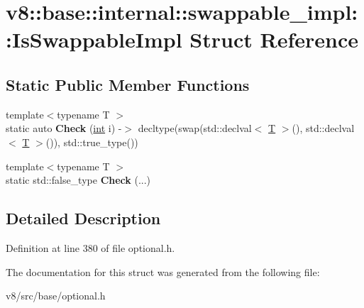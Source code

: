 \hypertarget{structv8_1_1base_1_1internal_1_1swappable__impl_1_1IsSwappableImpl}{}\section{v8\+:\+:base\+:\+:internal\+:\+:swappable\+\_\+impl\+:\+:Is\+Swappable\+Impl Struct Reference}
\label{structv8_1_1base_1_1internal_1_1swappable__impl_1_1IsSwappableImpl}
\subsection*{Static Public Member Functions}
\begin{DoxyCompactItemize}
\item 
\mbox{\label{structv8_1_1base_1_1internal_1_1swappable__impl_1_1IsSwappableImpl_ade0dc9d10f9b4cda499a72e1e39bd651}} 
{\footnotesize template$<$typename T $>$ }\\static auto {\bfseries Check} (\mbox{\hyperlink{classint}{int}} i) -\/$>$ decltype(swap(std\+::declval$<$ \mbox{\hyperlink{classv8_1_1internal_1_1torque_1_1T}{T}} $>$(), std\+::declval$<$ \mbox{\hyperlink{classv8_1_1internal_1_1torque_1_1T}{T}} $>$()), std\+::true\+\_\+type())
\item 
\mbox{\label{structv8_1_1base_1_1internal_1_1swappable__impl_1_1IsSwappableImpl_a34d0f9e24ea2958f919b47f986ae38e5}} 
{\footnotesize template$<$typename T $>$ }\\static std\+::false\+\_\+type {\bfseries Check} (...)
\end{DoxyCompactItemize}


\subsection{Detailed Description}


Definition at line 380 of file optional.\+h.



The documentation for this struct was generated from the following file\+:\begin{DoxyCompactItemize}
\item 
v8/src/base/optional.\+h\end{DoxyCompactItemize}
